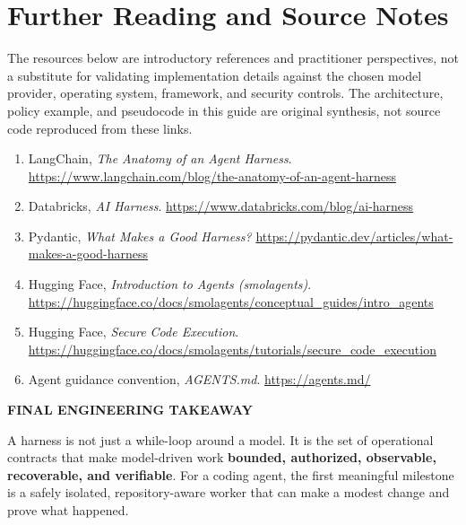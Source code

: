 \documentclass[10pt,letterpaper]{article}
\newcommand{\smallcaplabel}[1]{\textsf{\bfseries\footnotesize\color{Ocean}\MakeUppercase{#1}}}
\begin{document}
\section{Further Reading and Source Notes}
The resources below are introductory references and practitioner perspectives, not a substitute for validating implementation details against the chosen model provider, operating system, framework, and security controls. The architecture, policy example, and pseudocode in this guide are original synthesis, not source code reproduced from these links.
\begin{enumerate}
  \item LangChain, \emph{The Anatomy of an Agent Harness}. \url{https://www.langchain.com/blog/the-anatomy-of-an-agent-harness}
  \item Databricks, \emph{AI Harness}. \url{https://www.databricks.com/blog/ai-harness}
  \item Pydantic, \emph{What Makes a Good Harness?} \url{https://pydantic.dev/articles/what-makes-a-good-harness}
  \item Hugging Face, \emph{Introduction to Agents (smolagents)}. \url{https://huggingface.co/docs/smolagents/conceptual_guides/intro_agents}
  \item Hugging Face, \emph{Secure Code Execution}. \url{https://huggingface.co/docs/smolagents/tutorials/secure_code_execution}
  \item Agent guidance convention, \emph{AGENTS.md}. \url{https://agents.md/}
\end{enumerate}

\vspace{4mm}
\begin{summarybox}
\smallcaplabel{Final engineering takeaway}\par
A harness is not just a while-loop around a model. It is the set of operational contracts that make model-driven work \textbf{bounded, authorized, observable, recoverable, and verifiable}. For a coding agent, the first meaningful milestone is a safely isolated, repository-aware worker that can make a modest change and prove what happened.
\end{summarybox}
\end{document}
